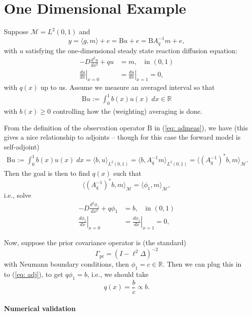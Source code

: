 \documentclass[ba]{imsart}
\theoremstyle{plain}
\newcommand{\obs}{{y}}
\newcommand{\prcov}{\Gamma_{\mathrm{pr}}}
\newcommand{\B}{\mathrm{B}}
\newcommand{\M}{\mathcal{M}}
\begin{document}
\section{One Dimensional Example}
Suppose $\M=L^2(0,1)$ and 
\[\obs=\langle g,m\rangle+e=\B u +e=\B A^{-1}_qm+e,\]
with $u$ satisfying the one-dimensional steady state reaction diffusion equation:
\begin{equation}
\begin{aligned}\label{eq: fwd}
-D\frac{d^2u}{dx^2} + qu &= m,\quad \text{in } (0,1)\\
\left.\frac{du}{dx}\right|_{x=0}&=\left.\frac{du}{dx}\right|_{x=1}=0,
\end{aligned}
\end{equation}
with $q(x)$ up to us. Assume we measure an averaged interval so that 
\begin{align}
\B u:=\int_{0}^{ 1} b(x)u(x) \;dx\in\mathbb{R}\label{eq: admeas}
\end{align}
with $b(x)\geq 0$ controlling how the (weighting) averaging is done.

From the definition of the observation operator $\B$ in (\ref{eq: admeas}), we have (this gives a nice relationship to adjoints -- though for this case the forward model is self-adjoint)
\begin{align}
\B u:=\int_{0}^{ 1} b(x)u(x) \;dx=\langle b,u\rangle_{L^2(0,1)}=\langle b, A^{-1}_qm\rangle_{L^2(0,1)}=\langle (A^{-1}_q)^\ast b, m\rangle_\M.
\end{align}
Then the goal is then to find $q(x)$ such that 
\[\langle (A^{-1}_q)^\ast b, m\rangle_\M=\langle \phi_1,m\rangle_\M,\]
i.e., solve
\begin{equation}
\begin{aligned}\label{eq: adj}
-D\frac{d^2\phi_1}{dx^2} + q\phi_1 &= b,\quad \text{in } (0,1)\\
\left.\frac{d\phi_1}{dx}\right|_{x=0}&=\left.\frac{d\phi_1}{dx}\right|_{x=1}=0,
\end{aligned}
\end{equation}

Now, suppose the prior covariance operator is (the standard) 
\[\prcov=(I - \ell^2 \Delta)^{-2}\]
with Neumann boundary conditions, then $\phi_1=c\in\mathbb{R}$. Then we can plug this in to (\ref{eq: adj}), to get $q\phi_1=b$, i.e., we should take 
\[q(x)=\frac{b}{c}\propto b.\]

\paragraph{Numerical validation}
\end{document}
